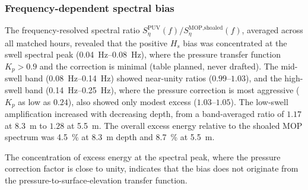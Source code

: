 
\subsubsection{Frequency-dependent spectral bias}

The frequency-resolved spectral ratio
$S_\eta^\text{PUV}(f) / S_\eta^\text{MOP,shoaled}(f)$, averaged across
all matched hours, revealed that the positive $H_s$ bias was concentrated
at the swell spectral peak (\SIrange{0.04}{0.08}{\hertz}), where the
pressure transfer function $K_p > 0.9$ and the correction is minimal
(table planned, never drafted). The mid-swell band
(\SIrange{0.08}{0.14}{\hertz}) showed near-unity ratios ($0.99$--$1.03$),
and the high-swell band (\SIrange{0.14}{0.25}{\hertz}), where the
pressure correction is most aggressive ($K_p$ as low as $0.24$), also
showed only modest excess ($1.03$--$1.05$). The low-swell amplification
increased with decreasing depth, from a band-averaged ratio of $1.17$ at
\SI{8.3}{\meter} to $1.28$ at \SI{5.5}{\meter}. The overall excess
energy relative to the shoaled MOP spectrum was \SI{4.5}{\percent} at
\SI{8.3}{\meter} depth and \SI{8.7}{\percent} at \SI{5.5}{\meter}.

The concentration of excess energy at the spectral peak, where the
pressure correction factor is close to unity, indicates that the bias
does not originate from the pressure-to-surface-elevation transfer
function.



